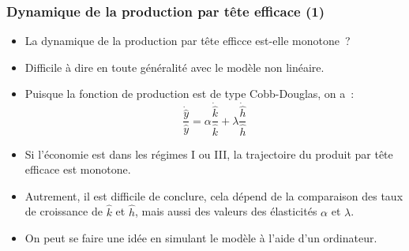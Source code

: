 \documentclass[10pt,notheorems]{beamer}
\theoremstyle{plain}
\theoremstyle{definition} %
\begin{document}
\begin{frame}
  \frametitle{Dynamique de la production par tête efficace (1)}

  \begin{itemize}

  \item La dynamique de la production par tête efficce est-elle monotone~?\newline

  \item Difficile à dire en toute généralité avec le modèle non linéaire.\newline

  \item Puisque la fonction de production est de type Cobb-Douglas, on a~:
    \[
      \frac{\dot{\hat y}}{\hat y} = \alpha\frac{\dot{\hat k}}{\hat k} + \lambda\frac{\dot{\hat h}}{\hat h}
    \]
  \item Si l'économie est dans les régimes I ou III, la trajectoire du produit
    par tête efficace est monotone.\newline

  \item Autrement, il est difficile de conclure, cela dépend de la comparaison
    des taux de croissance de $\hat k$ et $\hat h$, mais aussi des valeurs des
    élasticités $\alpha$ et $\lambda$.\newline

  \item On peut se faire une idée en simulant le modèle à l'aide d'un ordinateur.

  \end{itemize}

\end{frame}
\end{document}
